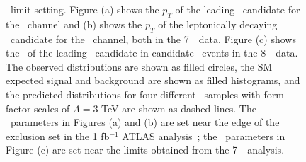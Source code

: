\begin{figure}[htbp]
\begin{center}
{\TGC\ limit setting.  Figure (a) shows the $p_T$ of the leading \Z\ candidate
for the \ZZllll\ channel and (b) shows the $p_T$ of the leptonically decaying
\Z\ candidate for the \ZZllvv\ channel, both in the 7~\tev\ data. Figure (c)
shows the \pt\ of the leading \Z\ candidate in candidate \ZZllll\ events in
the 8~\tev\ data.  The observed distributions are shown as filled circles, the
SM expected signal and background are shown as filled histograms, and the
predicted distributions for four different \TGC\ samples with form factor
scales of $\Lambda=3$ TeV are shown as dashed lines.  The \TGC\ parameters in
Figures (a) and (b) are set near the edge of the exclusion set in the 1
fb$^{-1}$ ATLAS analysis~\cite{ATLAS_ZZ4l:1fb2011}; the \TGC\ parameters in
Figure (c) are set near the limits obtained from the 7~\tev\ analysis.}
\label{fig:tgc-nicePlot}
\end{center}
\end{figure}



